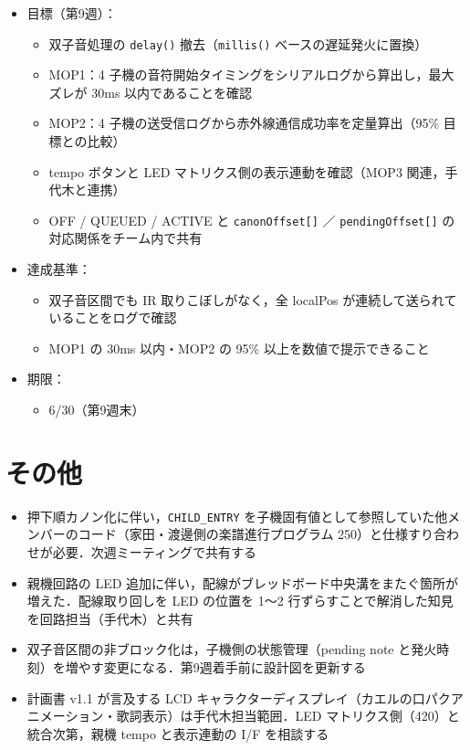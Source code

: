 \documentclass[a4paper,11pt]{ltjsarticle}
\providecommand{\％}{\%}
\begin{document}
\begin{itemize}
    \item 目標（第9週）：
    \begin{itemize}
        \item 双子音処理の \texttt{delay()} 撤去（\texttt{millis()} ベースの遅延発火に置換）
        \item MOP1：4 子機の音符開始タイミングをシリアルログから算出し，最大ズレが 30ms 以内であることを確認
        \item MOP2：4 子機の送受信ログから赤外線通信成功率を定量算出（95\% 目標との比較）
        \item tempo ボタンと LED マトリクス側の表示連動を確認（MOP3 関連，手代木と連携）
        \item OFF / QUEUED / ACTIVE と \texttt{canonOffset[]} ／ \texttt{pendingOffset[]} の対応関係をチーム内で共有
    \end{itemize}
    \item 達成基準：
    \begin{itemize}
        \item 双子音区間でも IR 取りこぼしがなく，全 localPos が連続して送られていることをログで確認
        \item MOP1 の 30ms 以内・MOP2 の 95\% 以上を数値で提示できること
    \end{itemize}
    \item 期限：
    \begin{itemize}
        \item 6/30（第9週末）
    \end{itemize}
\end{itemize}

\section{その他}\label{sec:other}

\begin{itemize}
    \item 押下順カノン化に伴い，\texttt{CHILD\_ENTRY} を子機固有値として参照していた他メンバーのコード（家田・渡邊側の楽譜進行プログラム 250）と仕様すり合わせが必要．次週ミーティングで共有する
    \item 親機回路の LED 追加に伴い，配線がブレッドボード中央溝をまたぐ箇所が増えた．配線取り回しを LED の位置を 1〜2 行ずらすことで解消した知見を回路担当（手代木）と共有
    \item 双子音区間の非ブロック化は，子機側の状態管理（pending note と発火時刻）を増やす変更になる．第9週着手前に設計図を更新する
    \item 計画書 v1.1 が言及する LCD キャラクターディスプレイ（カエルの口パクアニメーション・歌詞表示）は手代木担当範囲．LED マトリクス側（420）と統合次第，親機 tempo と表示連動の I/F を相談する
\end{itemize}
\end{document}
